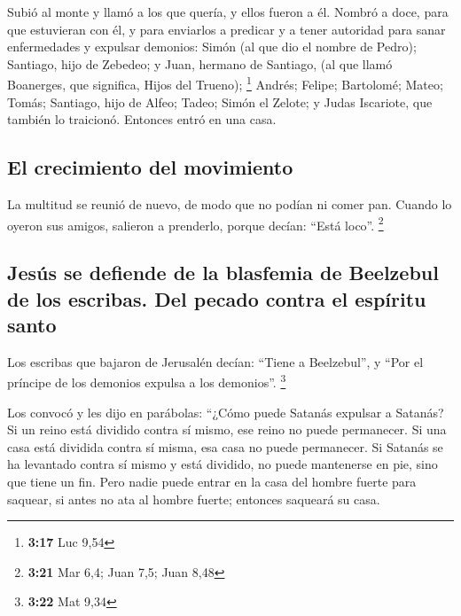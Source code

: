  Subió al monte y llamó a los que quería, y ellos fueron
a él.  Nombró a doce, para que estuvieran con él, y para
enviarlos a predicar  y a tener autoridad para sanar
enfermedades y expulsar demonios:  Simón (al que dio el
nombre de Pedro);  Santiago, hijo de Zebedeo; y Juan,
hermano de Santiago, (al que llamó Boanerges, que significa, Hijos del
Trueno); \footnote{\textbf{3:17} Luc 9,54}  Andrés;
Felipe; Bartolomé; Mateo; Tomás; Santiago, hijo de Alfeo; Tadeo; Simón
el Zelote;  y Judas Iscariote, que también lo traicionó.
Entonces entró en una casa.

\hypertarget{el-crecimiento-del-movimiento}{%
\subsection{El crecimiento del
movimiento}\label{el-crecimiento-del-movimiento}}

 La multitud se reunió de nuevo, de modo que no podían ni
comer pan.  Cuando lo oyeron sus amigos, salieron a
prenderlo, porque decían: ``Está loco''. \footnote{\textbf{3:21} Mar
  6,4; Juan 7,5; Juan 8,48}

\hypertarget{jesuxfas-se-defiende-de-la-blasfemia-de-beelzebul-de-los-escribas.-del-pecado-contra-el-espuxedritu-santo}{%
\subsection{Jesús se defiende de la blasfemia de Beelzebul de los
escribas. Del pecado contra el espíritu
santo}\label{jesuxfas-se-defiende-de-la-blasfemia-de-beelzebul-de-los-escribas.-del-pecado-contra-el-espuxedritu-santo}}

 Los escribas que bajaron de Jerusalén decían: ``Tiene a
Beelzebul'', y ``Por el príncipe de los demonios expulsa a los
demonios''. \footnote{\textbf{3:22} Mat 9,34}

 Los convocó y les dijo en parábolas: ``¿Cómo puede
Satanás expulsar a Satanás?  Si un reino está dividido
contra sí mismo, ese reino no puede permanecer.  Si una
casa está dividida contra sí misma, esa casa no puede permanecer.
 Si Satanás se ha levantado contra sí mismo y está
dividido, no puede mantenerse en pie, sino que tiene un fin.
 Pero nadie puede entrar en la casa del hombre fuerte
para saquear, si antes no ata al hombre fuerte; entonces saqueará su
casa.

